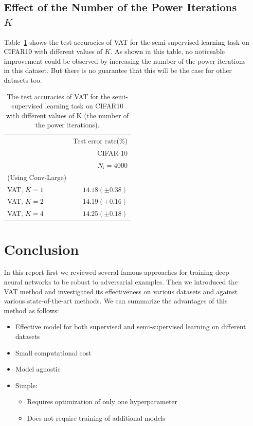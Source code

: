 \documentclass[paper=a4, fontsize=11pt]{scrartcl}
\numberwithin{equation}{section}		%
\numberwithin{figure}{section}			%
\numberwithin{table}{section}				%
\begin{document}
\subsection{Effect of the Number of the Power Iterations \(K\)}
Table~\ref{tab:different_K} shows the test accuracies of VAT for the semi-supervised learning task on CIFAR10 with different values of \(K\).
As shown in this table, no noticeable improvement could be observed by increasing the number of the power iterations in this dataset.
But there is no guarantee that this will be the case for other datasets too.

\begin{table}[H]
  \label{tab:different_K}
  \centering
  \caption{The test accuracies of VAT for the semi-supervised
  learning task on CIFAR10 with different values of K (the
  number of the power iterations).}
\label{tab:different_K}
\begin{tabular}{l r}
\hline
\hline
& Test error rate(\%)\\
& CIFAR-10\\
& \(N_l = 4000\)\\
\hline
(Using Conv-Large)&\\
VAT, \(K = 1\) & \(14.18 (\pm0.38)\)\\
VAT, \(K = 2\) & \(14.19 (\pm0.16)\)\\
VAT, \(K = 4\) & \(14.25 (\pm0.18)\)\\
\hline
\hline
\end{tabular}
\end{table}

\section{Conclusion}
In this report first we reviewed several famous approaches for training deep neural networks to be robust to adversarial examples.
Then we introduced the VAT method and investigated its effectiveness on various datasets and against various state-of-the-art methods.
We can summarize the advantages of this method as follows:
\begin{itemize}
\item Effective model for both supervised and semi-supervised learning on different datasets
\item Small computational cost
\item Model agnostic
\item Simple:
\begin{itemize}
\item Requires optimization of only one hyperparameter
\item Does not require training of additional models
\end{itemize}
\end{itemize}
\end{document}
